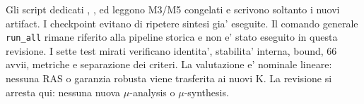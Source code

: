 Gli script dedicati ,
, 
ed  leggono M3/M5 congelati e scrivono
soltanto i nuovi artifact. I checkpoint evitano di ripetere sintesi
gia' eseguite. Il comando generale \texttt{run\_all} rimane riferito
alla pipeline storica e non e' stato eseguito in questa revisione.
I sette test mirati verificano identita', stabilita' interna, bound,
66 avvii, metriche e separazione dei criteri. La valutazione e' nominale
lineare: nessuna RAS o garanzia robusta viene trasferita ai nuovi K.
La revisione si arresta qui: nessuna nuova $\mu$-analysis o $\mu$-synthesis.
\clearpage
